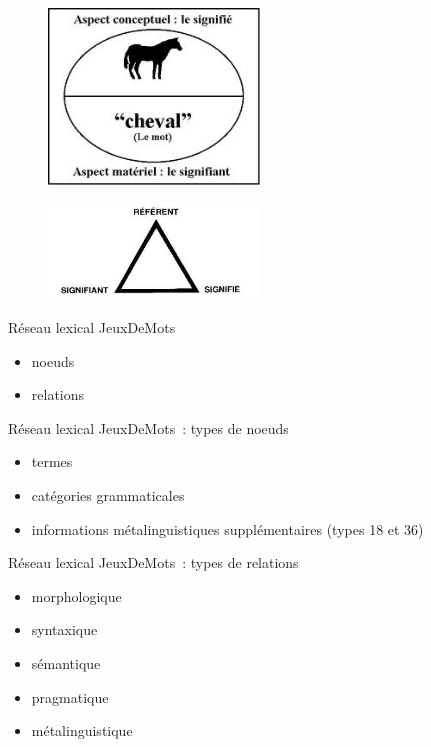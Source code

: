 \documentclass{beamer}
\begin{document}
\begin{frame}
\begin{figure}[h!]
  \centering
      \includegraphics[width=0.5\textwidth]{img/signe-cheval.jpeg}
\end{figure}
\end{frame}

\begin{frame}
\begin{figure}[h!]
  \centering
      \includegraphics[width=0.5\textwidth]{img/trianglesemiotique.jpeg}
\end{figure}
\end{frame}

\begin{frame}
  Réseau lexical JeuxDeMots
  \begin{itemize}
  \item noeuds
  \item relations
  \end{itemize}
\end{frame}

\begin{frame}
  Réseau lexical JeuxDeMots~: types de noeuds
  \begin{itemize}
  \item termes
  \item catégories grammaticales
  \item informations métalinguistiques supplémentaires (types 18 et 36)
  \end{itemize}
\end{frame}

\begin{frame}
  Réseau lexical JeuxDeMots~: types de relations
  \begin{itemize}
  \item morphologique
  \item syntaxique
  \item sémantique
  \item pragmatique
  \item métalinguistique
  \end{itemize}
\end{frame}
\end{document}
